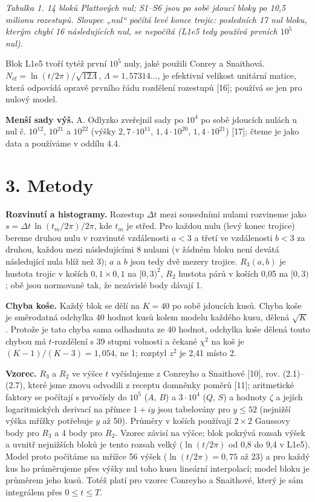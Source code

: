 \documentclass[
  10pt,
]{article}
\begin{document}
\emph{Tabulka 1. 14 bloků Plattových nul; S1--S6 jsou po sobě jdoucí
bloky po 10,5 milionu rozestupů. Sloupec „nul`` počítá levé konce
trojic: posledních 17 nul bloku, kterým chybí 16 následujících nul, se
nepočítá (L1e5 tedy používá prvních \(10^5\) nul).}

Blok L1e5 tvoří tytéž první \(10^5\) nuly, jaké použili Conrey a
Snaithová. \(N_{\mathrm{ef}} = \ln(t/2\pi)/\sqrt{12\Lambda}\),
\(\Lambda = 1{,}57314\ldots\), je efektivní velikost unitární matice,
která odpovídá opravě prvního řádu rozdělení rozestupů {[}16{]}; používá
se jen pro nulový model.

\textbf{Menší sady výš.} A. Odlyzko zveřejnil sady po \(10^4\) po sobě
jdoucích nulách u nul č. \(10^{12}\), \(10^{21}\) a \(10^{22}\) (výšky
\(2{,}7\cdot10^{11}\), \(1{,}4\cdot10^{20}\), \(1{,}4\cdot10^{21}\))
{[}17{]}; čteme je jako data a používáme v oddílu 4.4.

\hypertarget{metody}{%
\section{3. Metody}\label{metody}}

\textbf{Rozvinutí a histogramy.} Rozestup \(\Delta t\) mezi sousedními
nulami rozvineme jako \(s = \Delta t\,\ln(t_m/2\pi)/2\pi\), kde \(t_m\)
je střed. Pro každou nulu (levý konec trojice) bereme druhou nulu v
rozvinuté vzdálenosti \(a < 3\) a třetí ve vzdálenosti \(b < 3\) za
druhou, každou mezi následujícími 8 nulami (v žádném bloku není devátá
následující nula blíž než 3); \(a\) a \(b\) jsou tedy dvě mezery
trojice. \(R_3(a, b)\) je hustota trojic v koších \(0{,}1 \times 0{,}1\)
na \([0, 3)^2\), \(R_2\) hustota párů v koších 0,05 na \([0, 3)\); obě
jsou normované tak, že nezávislé body dávají 1.

\textbf{Chyba koše.} Každý blok se dělí na \(K = 40\) po sobě jdoucích
kusů. Chyba koše je směrodatná odchylka 40 hodnot kusů kolem modelu
každého kusu, dělená \(\sqrt{K}\). Protože je tato chyba sama odhadnuta
ze 40 hodnot, odchylka koše dělená touto chybou má \(t\)-rozdělení s 39
stupni volnosti a čekané \(\chi^2\) na koš je \((K-1)/(K-3) = 1{,}054\),
ne 1; rozptyl \(z^2\) je 2,41 místo 2.

\textbf{Vzorec.} \(R_3\) a \(R_2\) ve výšce \(t\) vyčíslujeme z Conreyho
a Snaithové {[}10{]}, rov. (2.1)--(2.7), které jsme znovu odvodili z
receptu domněnky poměrů {[}11{]}; aritmetické faktory se počítají s
prvočísly do \(10^5\) (\(A\), \(B\)) a \(3\cdot10^4\) (\(Q\), \(S\)) a
hodnoty \(\zeta\) a jejích logaritmických derivací na přímce \(1 + iy\)
jsou tabelovány pro \(y \le 52\) (nejnižší výška mřížky potřebuje \(y\)
až 50). Průměry v koších používají \(2 \times 2\) Gaussovy body pro
\(R_3\) a 4 body pro \(R_2\). Vzorec závisí na výšce; blok pokrývá
rozsah výšek a uvnitř nejnižších bloků je tento rozsah velký
(\(\ln(t/2\pi)\) od 0,8 do 9,4 v L1e5). Model proto počítáme na mřížce
56 výšek (\(\ln(t/2\pi) = 0{,}75\) až 23) a pro každý kus ho průměrujeme
přes výšky nul toho kusu lineární interpolací; model bloku je průměrem
jeho kusů. Totéž platí pro vzorec Conreyho a Snaithové, který je sám
integrálem přes \(0 \le t \le T\).
\end{document}
